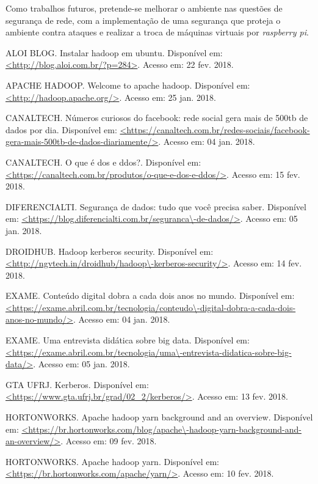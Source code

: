 Como trabalhos futuros, pretende-se melhorar o ambiente nas questões de segurança de rede, com a implementação de uma segurança que proteja o ambiente contra ataques e realizar a troca de máquinas virtuais por \textit{raspberry pi}.

\begin{thebibliography}{99}

 ALOI BLOG. Instalar hadoop em ubuntu. Disponível em: \url{<http://blog.aloi.com.br/?p=284>}. Acesso em: 22 fev. 2018.

 APACHE HADOOP. Welcome to apache hadoop. Disponível em: \url{<http://hadoop.apache.org/>}. Acesso em: 25 jan. 2018.

 CANALTECH. Números curiosos do facebook: rede social gera mais de 500tb de dados por dia. Disponível em: \url{<https://canaltech.com.br/redes-sociais/facebook-gera-mais-500tb-de-dados-diariamente/>}. Acesso em: 04 jan. 2018.

 CANALTECH. O que é dos e ddos?. Disponível em: \url{<https://canaltech.com.br/produtos/o-que-e-dos-e-ddos/>}. Acesso em: 15 fev. 2018.

 DIFERENCIALTI. Segurança de dados: tudo que você precisa saber. Disponível em: \url{<https://blog.diferencialti.com.br/seguranca\-de-dados/>}. Acesso em: 05 jan. 2018.

 DROIDHUB. Hadoop kerberos security. Disponível em: \url{<http://ngvtech.in/droidhub/hadoop\-kerberos-security/>}. Acesso em: 14 fev. 2018.

 EXAME. Conteúdo digital dobra a cada dois anos no mundo. Disponível em: \url{<https://exame.abril.com.br/tecnologia/conteudo\-digital-dobra-a-cada-dois-anos-no-mundo/>}. Acesso em: 04 jan. 2018.

 EXAME. Uma entrevista didática sobre big data. Disponível em: \url{<https://exame.abril.com.br/tecnologia/uma\-entrevista-didatica-sobre-big-data/>}. Acesso em: 05 jan. 2018.

 GTA UFRJ. Kerberos. Disponível em: \url{<https://www.gta.ufrj.br/grad/02\_2/kerberos/>}. Acesso em: 13 fev. 2018.

 HORTONWORKS. Apache hadoop yarn background and an overview. Disponível em: \url{<https://br.hortonworks.com/blog/apache\-hadoop-yarn-background-and-an-overview/>}. Acesso em: 09 fev. 2018.

 HORTONWORKS. Apache hadoop yarn. Disponível em: \url{<https://br.hortonworks.com/apache/yarn/>}. Acesso em: 10 fev. 2018.


\end{thebibliography}
